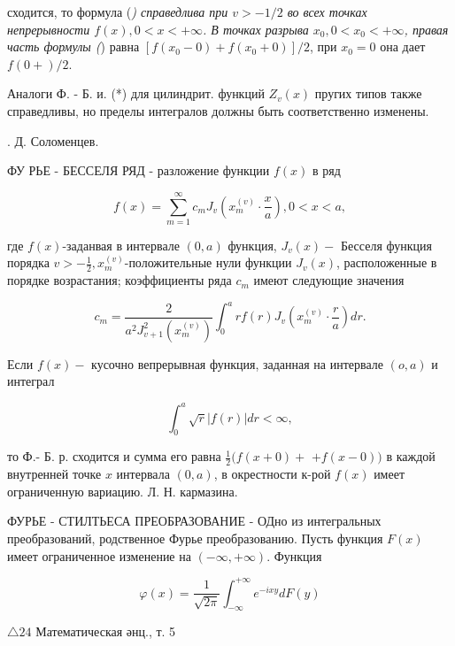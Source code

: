\documentclass[10pt]{article}
\begin{document}
сходится, то формула (\textit{) справедлива при $v>-1 / 2$ во всех точках непрерывности $f(x), 0<x<+\infty$. В точках разрыва $x_{0}, 0<x_{0}<+\infty$, правая часть формулы (}) равна $\left[f\left(x_{0}-0\right)+f\left(x_{0}+0\right)\right] / 2$, при $x_{0}=0$ она дает $f(0+) / 2$.



Аналоги Ф. - Б. и. (*) для цилиндрит. функций $Z_{v}(x)$ пругих типов также справедливы, но пределы интегралов должны быть соответственно изменены.



. Д. Соломенцев.



ФУ РЬЕ - БЕССЕЛЯ РЯД - разложение функции $f(x)$ в ряд



\[

f(x)=\sum_{m=1}^{\infty} c_{m} J_{v}\left(x_{m}^{(v)} \cdot \frac{x}{a}\right), 0<x<a,

\]



где $f(x)$-заданвая в интервале $(0, a)$ функция, $J_{v}(x)-$ Бесселя функция порядка $v>-\frac{1}{2}, x_{m}^{(v)}$-положительные нули функции $J_{v}(x)$, расположенные в порядке возрастания; коэффициенты ряда $c_{m}$ имеют следующие значения



\[

c_{m}=\frac{2}{a^{2} J_{v+1}^{2}\left(x_{m}^{(v)}\right)} \int_{0}^{a} r f(r) J_{v}\left(x_{m}^{(v)} \cdot \frac{r}{a}\right) d r .

\]



Если $f(x)-$ кусочно вепрерывная функция, заданная на интервале $(o, a)$ и интеграл



\[

\int_{0}^{a} \sqrt{r}|f(r)| d r<\infty,

\]



то Ф.- Б. р. сходится и сумма его равна $\frac{1}{2}(f(x+0)+$ $+f(x-0))$ в каждой внутренней точке $x$ интервала $(0, a)$, в окрестности к-рой $f(x)$ имеет ограниченную вариацию. Л. Н. кармазина.



ФУРЬЕ - СТИЛТЬЕСА ПРЕОБРАЗОВАНИЕ - ОДно из интегральных преобразований, родственное Фурье преобразованию. Пусть функция $F(x)$ имеет ограниченное изменение на $(-\infty,+\infty)$. Функция



\[

\varphi(x)=\frac{1}{\sqrt{2 \pi}} \int_{-\infty}^{+\infty} e^{-i x y} d F(y)

\]



$\triangle 24$ Математическая әнц., т. 5
\end{document}
